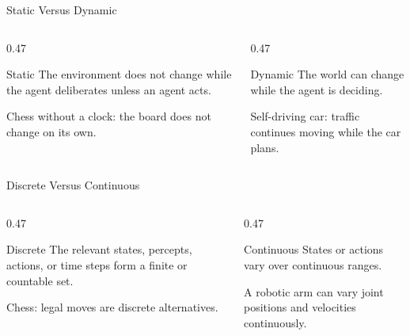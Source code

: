 \documentclass[aspectratio=169,10pt]{beamer}
\begin{document}
\begin{frame}{Static Versus Dynamic}
  \begin{columns}[T,onlytextwidth]
    \begin{column}{0.47\textwidth}
      \begin{block}{Static}
        The environment does not change while the agent deliberates unless an agent acts.
      \end{block}
      \begin{exampleblockcp}
        Chess without a clock: the board does not change on its own.
      \end{exampleblockcp}
    \end{column}
    \begin{column}{0.47\textwidth}
      \begin{block}{Dynamic}
        The world can change while the agent is deciding.
      \end{block}
      \begin{exampleblockcp}
        Self-driving car: traffic continues moving while the car plans.
      \end{exampleblockcp}
    \end{column}
  \end{columns}
\end{frame}

\begin{frame}{Discrete Versus Continuous}
  \begin{columns}[T,onlytextwidth]
    \begin{column}{0.47\textwidth}
      \begin{block}{Discrete}
        The relevant states, percepts, actions, or time steps form a finite or countable set.
      \end{block}
      \begin{exampleblockcp}
        Chess: legal moves are discrete alternatives.
      \end{exampleblockcp}
    \end{column}
    \begin{column}{0.47\textwidth}
      \begin{block}{Continuous}
        States or actions vary over continuous ranges.
      \end{block}
      \begin{exampleblockcp}
        A robotic arm can vary joint positions and velocities continuously.
      \end{exampleblockcp}
    \end{column}
  \end{columns}
\end{frame}
\end{document}
